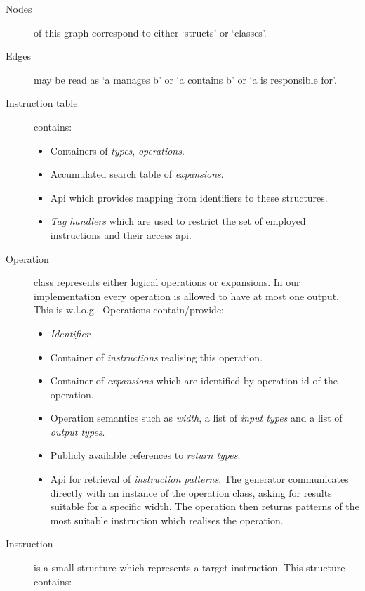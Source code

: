 
\begin{description}
  \item [Nodes] of this graph correspond to either `structs' or `classes'.
  \item [Edges] may be read as `a manages b' or `a contains b' or `a is responsible for'.
\end{description}

\begin{description}
  \item[Instruction table] contains:
    \begin{itemize}
      \item Containers of \emph{types}, \emph{operations}.
      \item Accumulated search table of \emph{expansions}.
      \item Api which provides mapping from identifiers to these structures.
      \item \emph{Tag handlers} which are used to restrict the set of employed instructions and their access api.
    \end{itemize}
  \item[Operation] class represents either logical operations or expansions. In our implementation every operation is allowed to have at most one output. This is w.l.o.g.. Operations contain/provide:
    \begin{itemize}
      \item \emph{Identifier}.
      \item Container of \emph{instructions} realising this operation.
      \item Container of \emph{expansions} which are identified by operation id of the operation.
      \item Operation semantics such as \emph{width}, a list of \emph{input types} and a list of \emph{output types}.
      \item Publicly available references to \emph{return types}.
      \item Api for retrieval of \emph{instruction patterns}. The generator communicates directly with an instance of the operation class, asking for results suitable for a specific width. The operation then returns patterns of the most suitable instruction which realises the operation.
    \end{itemize} 
  \item[Instruction] is a small structure which represents a target instruction. This structure contains:

\end{description}
